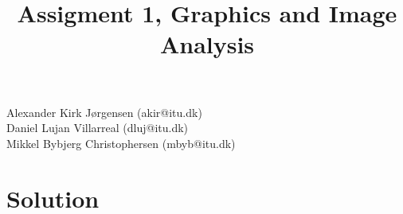 \documentclass{article}
\title{Assigment 1, Graphics and Image Analysis}
\begin{document}
	\maketitle
	\begin{center}
	Alexander Kirk Jørgensen (akir@itu.dk)\\
	Daniel Lujan Villarreal (dluj@itu.dk)\\
	Mikkel Bybjerg Christophersen (mbyb@itu.dk)\\
	\newline
	
	\newpage
	\tableofcontents
	\newpage
	\end{center}
	
	
	\section{Solution}
	
	
	
	
	
\end{document}
